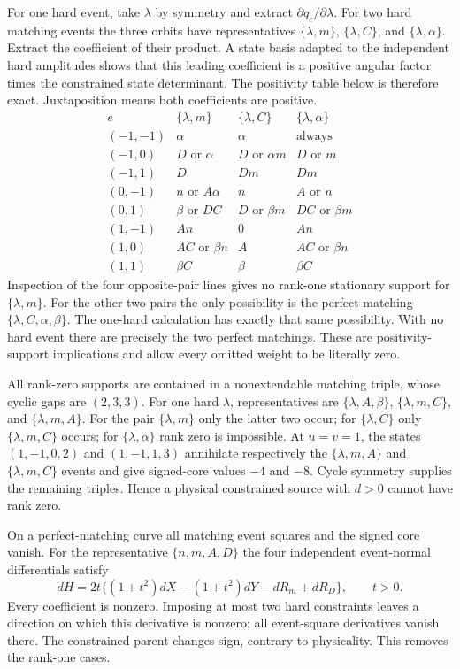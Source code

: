 For one hard event, take $\lambda$ by symmetry and extract
$\partial q_e/\partial\lambda$. For two hard matching events the three
orbits have representatives $\{\lambda,m\}$, $\{\lambda,C\}$,
and $\{\lambda,\alpha\}$. Extract the coefficient of their product.
A state basis adapted to the independent hard amplitudes shows that this
leading coefficient is a positive angular factor times the constrained
state determinant. The positivity table below is therefore exact.
Juxtaposition means both coefficients are positive.
\[
\begin{array}{c|ccc}
e&\{\lambda,m\}&\{\lambda,C\}&\{\lambda,\alpha\}\\\hline
(-1,-1)&\alpha&\alpha&\text{always}\\
(-1,0)&D\text{ or }\alpha&D\text{ or }\alpha m&D\text{ or }m\\
(-1,1)&D&Dm&Dm\\
(0,-1)&n\text{ or }A\alpha&n&A\text{ or }n\\
(0,1)&\beta\text{ or }DC&D\text{ or }\beta m&DC\text{ or }\beta m\\
(1,-1)&An&0&An\\
(1,0)&AC\text{ or }\beta n&A&AC\text{ or }\beta n\\
(1,1)&\beta C&\beta&\beta C
\end{array}
\]
Inspection of the four opposite-pair lines gives no rank-one stationary
support for $\{\lambda,m\}$. For the other two pairs the only
possibility is the perfect matching
$\{\lambda,C,\alpha,\beta\}$. The one-hard calculation has exactly
that same possibility. With no hard event there are precisely the two
perfect matchings. These are positivity-support implications and allow
every omitted weight to be literally zero.

All rank-zero supports are contained in a nonextendable matching triple,
whose cyclic gaps are $(2,3,3)$. For one hard $\lambda$, representatives
are $\{\lambda,A,\beta\}$, $\{\lambda,m,C\}$, and
$\{\lambda,m,A\}$. For the pair $\{\lambda,m\}$ only the latter
two occur; for $\{\lambda,C\}$ only $\{\lambda,m,C\}$ occurs;
for $\{\lambda,\alpha\}$ rank zero is impossible. At $u=v=1$, the
states $(1,-1,0,2)$ and $(1,-1,1,3)$ annihilate respectively the
$\{\lambda,m,A\}$ and $\{\lambda,m,C\}$ events and give signed-core
values $-4$ and $-8$. Cycle symmetry supplies the remaining triples.
Hence a physical constrained source with $d>0$ cannot have rank zero.

On a perfect-matching curve all matching event squares and the signed
core vanish. For the representative $\{n,m,A,D\}$ the four independent
event-normal differentials satisfy
\[
dH=2t\{(1+t^2)dX-(1+t^2)dY-dR_m+dR_D\},\qquad t>0.
\]
Every coefficient is nonzero. Imposing at most two hard constraints
leaves a direction on which this derivative is nonzero; all event-square
derivatives vanish there. The constrained parent changes sign, contrary
to physicality. This removes the rank-one cases.

